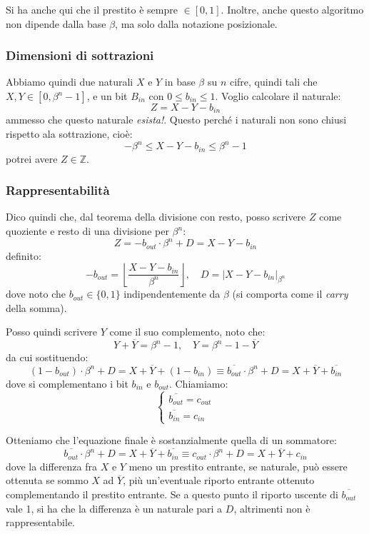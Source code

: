 \documentclass[a4paper,11pt]{article}
\begin{document}
Si ha anche qui che il prestito è sempre $\in [0, 1]$.
Inoltre, anche questo algoritmo non dipende dalla base $\beta$, ma solo dalla notazione posizionale.

\subsubsection{Dimensioni di sottrazioni}
Abbiamo quindi due naturali $X$ e $Y$ in base $\beta$ su $n$ cifre, quindi tali che $X, Y \in [0, \beta^n - 1]$, e un bit $B_{in}$ con $0 \leq b_{in} \leq 1$.
Voglio calcolare il naturale:
$$
Z = X - Y - b_{in}
$$
ammesso che questo naturale \textit{esista!}.
Questo perché i naturali non sono chiusi rispetto ala sottrazione, cioè:
$$ - \beta^n \leq X-Y-b_{in} \leq \beta^n -1$$
potrei avere $Z \in \mathbb{Z}$.

\subsubsection{Rappresentabilità}
Dico quindi che, dal teorema della divisione con resto, posso scrivere $Z$ come quoziente e resto di una divisione per $\beta^n$:
$$ Z = -b_{out} \cdot \beta^n + D = X - Y - b_{in} $$
definito:
$$
-b_{out} = \left\lfloor \frac{X-Y-b_{in}}{\beta^n} \right\rfloor, \quad D = |X-Y-b_{in}|_{\beta^n}
$$
dove noto che $b_{out} \in \{0 ,1\}$ indipendentemente da $\beta$ (si comporta come il \textit{carry} della somma). 

Posso quindi scrivere $Y$ come il suo complemento, noto che:
$$ 
Y + \overline{Y} = \beta^n - 1, \quad Y = \beta^n - 1 - \overline{Y}
$$
da cui sostituendo:
$$
(1 - b_{out}) \cdot \beta^n + D = X + \overline{Y} + (1-b_{in}) \equiv \overline{b_{out}} \cdot \beta^n + D = X + \overline{Y} + \overline{b_{in}}
$$
dove si complementano i bit $b_{in}$ e $b_{out}$.
Chiamiamo:
\[
	\begin{cases}
		\overline{b_{out}} = c_{out} \\ 
		\overline{b_{in}} = c_{in}
	\end{cases}
\]

Otteniamo che l'equazione finale è sostanzialmente quella di un sommatore:
$$ 
\overline{b_{out}} \cdot \beta^n + D = X + \overline{Y} + \overline{b_{in}} \equiv c_{out} \cdot \beta^n + D = X + \overline{Y} + c_{in}
$$
dove la differenza fra $X$ e $Y$ meno un prestito entrante, se naturale, può essere ottenuta se sommo $X$ ad $\overline{Y}$, più un'eventuale riporto entrante ottenuto complementando il prestito entrante.
Se a questo punto il riporto uscente di $\overline{b_{out}}$ vale 1, si ha che la differenza è un naturale pari a $D$, altrimenti non è rappresentabile.
\end{document}
